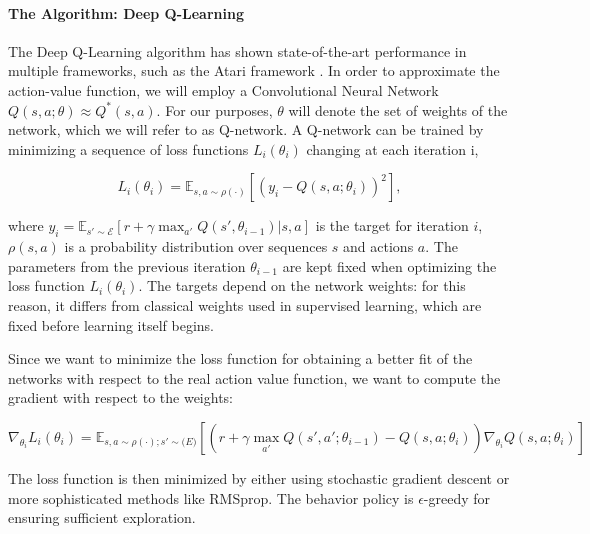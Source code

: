 \documentclass[11pt]{article}
\begin{document}
\paragraph{The Algorithm: Deep Q-Learning}

The Deep Q-Learning algorithm has shown state-of-the-art performance in multiple frameworks, such as the Atari framework \cite{mnih2013playing}. 
In order to approximate the action-value function,  we will employ a Convolutional Neural Network $Q(s,a; \theta) \approx Q^*(s,a)$. For our purposes, $\theta$ will denote the set of weights of the network, which we will refer to as Q-network. A Q-network can be trained by minimizing a sequence of loss functions $L_i(\theta_i)$ changing at each iteration i,

\begin{equation}
	L_i(\theta_i) = \mathbb{E}_{s,a \sim \rho(\cdot)}[\left(y_i - Q(s,a;\theta_i)\right)^2],
	\label{eq:lossfunction}
\end{equation}

where $y_i = \mathbb{E}_{s' \sim \mathcal{E}} [r + \gamma \max_{a'}Q(s', \theta_{i-1}) | s,a]$ is the target for iteration $i$, $\rho(s,a)$ is a probability distribution over sequences $s$ and actions $a$. The parameters from the previous iteration $\theta_{i-1}$ are kept fixed when optimizing the loss function $L_i(\theta_i)$. The targets depend on the network weights: for this reason, it differs from classical weights used in supervised learning, which are fixed before learning itself begins. 
\medskip

\indent Since we want to minimize the loss function for obtaining a better fit of the networks with respect to the real action value function, we want to compute the gradient with respect to the weights:

\begin{equation}
	\nabla_{\theta_i}L_i (\theta_i) = \mathbb{E}_{s,a \sim \rho(\cdot); s' \sim \mathcal(E)} [(r + \gamma \max_{a'} Q (s', a'; \theta_{i-1}) -  Q(s,a; \theta_i)) \nabla_{\theta_i} Q(s,a; \theta_i)]
	\label{eq:gradientloss}
\end{equation}

The loss function is then minimized by either using stochastic gradient descent or more sophisticated methods like RMSprop. The behavior policy is $\epsilon$-greedy for ensuring sufficient exploration.
\medskip 
\end{document}
